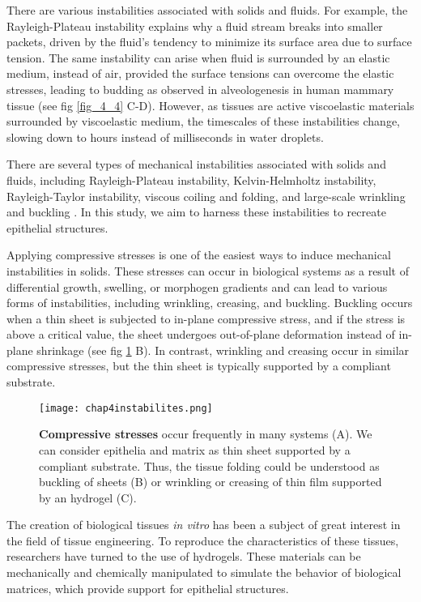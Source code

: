 There are various instabilities associated with solids and fluids. For example, the Rayleigh-Plateau instability explains why a fluid stream breaks into smaller packets, driven by the fluid's tendency to minimize its surface area due to surface tension. The same instability can arise when fluid is surrounded by an elastic medium, instead of air, provided the surface tensions can overcome the elastic stresses, leading to budding as observed in alveologenesis in human mammary tissue \cite{fernandez2021} (see fig \ref{fig_4_4} C-D). However, as tissues are active viscoelastic materials surrounded by viscoelastic medium, the timescales of these instabilities change, slowing down to hours instead of milliseconds in water droplets.

There are several types of mechanical instabilities associated with solids and fluids, including Rayleigh-Plateau instability, Kelvin-Helmholtz instability, Rayleigh-Taylor instability, viscous coiling and folding, and large-scale wrinkling and buckling \cite{gallaire2017, kourouklis2018}. In this study, we aim to harness these instabilities to recreate epithelial structures.

Applying compressive stresses is one of the easiest ways to induce mechanical instabilities in solids. These stresses can occur in biological systems as a result of differential growth, swelling, or morphogen gradients and can lead to various forms of instabilities, including wrinkling, creasing, and buckling. Buckling occurs when a thin sheet is subjected to in-plane compressive stress, and if the stress is above a critical value, the sheet undergoes out-of-plane deformation instead of in-plane shrinkage (see fig \ref{fig_4_5} B). In contrast, wrinkling and creasing occur in similar compressive stresses, but the thin sheet is typically supported by a compliant substrate.

\begin{figure}
	\centering
	\texttt{[image: chap4instabilites.png]}
	\caption{\label{fig_4_5} \textbf{Compressive stresses} occur frequently in many systems (A). We can consider epithelia and matrix as thin sheet supported by a compliant substrate. Thus, the tissue folding could be understood as buckling of sheets (B) or wrinkling or creasing of thin film supported by an hydrogel (C).}
\end{figure}

The creation of biological tissues \textit{in vitro} has been a subject of great interest in the field of tissue engineering. To reproduce the characteristics of these tissues, researchers have turned to the use of hydrogels. These materials can be mechanically and chemically manipulated to simulate the behavior of biological matrices, which provide support for epithelial structures.

